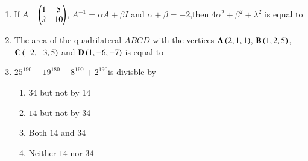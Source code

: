 \documentclass[journal]{IEEEtran}
\numberwithin{equation}{enumi}
\numberwithin{figure}{enumi}
\begin{document}
\begin{enumerate}
	\item If $A=\begin{pmatrix}1 & 5 \\ \lambda & 10\end{pmatrix}$, $A^{-1}=\alpha A+\beta I$ and $\alpha+\beta=-2$,then $4\alpha^2+\beta^2+\lambda^2$ is equal to
        \hfill{}
        \begin{enumerate}    
       \end{enumerate}
       
	\item 
	The area of the quadrilateral $ABCD$ with the vertices $\mathbf{A}\left(2, 1, 1\right)$, $\mathbf{B}\left(1, 2, 5\right)$, $\mathbf{C}\left(-2, -3, 5\right)$ and $\mathbf{D}\left(1, -6, -7\right)$ is equal to 
	\hfill{}
	\begin{enumerate}    
       \end{enumerate}
       
       
    \item $25^{190}-19^{180}-8^{190}+2^{190}$is divisble by
        \hfill{}
        \begin{multicols}{4}
            \begin{enumerate}
                \item $34$ but not by 14
                \item $14$ but not by 34
                \item Both $14$ and $34$
                \item Neither $14$ nor $34$
            \end{enumerate}
        \end{multicols}
        

\end{enumerate}
\end{document}
